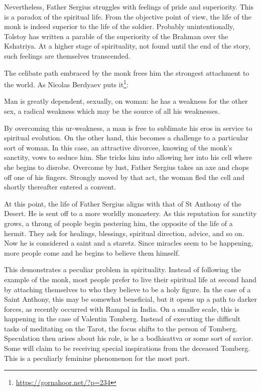 Nevertheless, Father Sergius struggles with feelings of pride and superiority. This is a paradox of the spiritual life. From the objective point of view, the life of the monk is indeed superior to the life of the soldier. Probably unintentionally, Tolstoy has written a parable of the superiority of the Brahman over the Kshatriya. At a higher stage of spirituality, not found until the end of the story, such feelings are themselves transcended.

The celibate path embraced by the monk frees him the strongest attachment to the world. As Nicolas Berdyaev puts it\footnote{\url{https://gornahoor.net/?p=234}}:

\begin{quotex}
Man is greatly dependent, sexually, on woman: he has a weakness for the other sex, a radical weakness which may be the source of all his weaknesses.
\end{quotex}





By overcoming this ur-weakness, a man is free to sublimate his eros in service to spiritual evolution. On the other hand, this becomes a challenge to a particular sort of woman. In this case, an attractive divorcee, knowing of the monk's sanctity, vows to seduce him. She tricks him into allowing her into his cell where she begins to disrobe. Overcome by lust, Father Sergius takes an axe and chops off one of his fingers. Strongly moved by that act, the woman fled the cell and shortly thereafter entered a convent.

At this point, the life of Father Sergius aligns with that of St Anthony of the Desert. He is sent off to a more worldly monastery. As this reputation for sanctity grows, a throng of people begin pestering him, the opposite of the life of a hermit. They ask for healings, blessings, spiritual direction, advice, and so on. Now he is considered a saint and a staretz. Since miracles seem to be happening, more people come and he begins to believe them himself.

This demonstrates a peculiar problem in spirituality. Instead of following the example of the monk, most people prefer to live their spiritual life at second hand by attaching themselves to who they believe to be a holy figure. In the case of a Saint Anthony, this may be somewhat beneficial, but it opens up a path to darker forces, as recently occurred with Rampal in India. On a smaller scale, this is happening in the case of Valentin Tomberg. Instead of executing the difficult tasks of meditating on the Tarot, the focus shifts to the person of Tomberg. Speculation then arises about his role, is he a bodhisattva or some sort of savior. Some will claim to be receiving special inspirations from the deceased Tomberg. This is a peculiarly feminine phenomenon for the most part.

